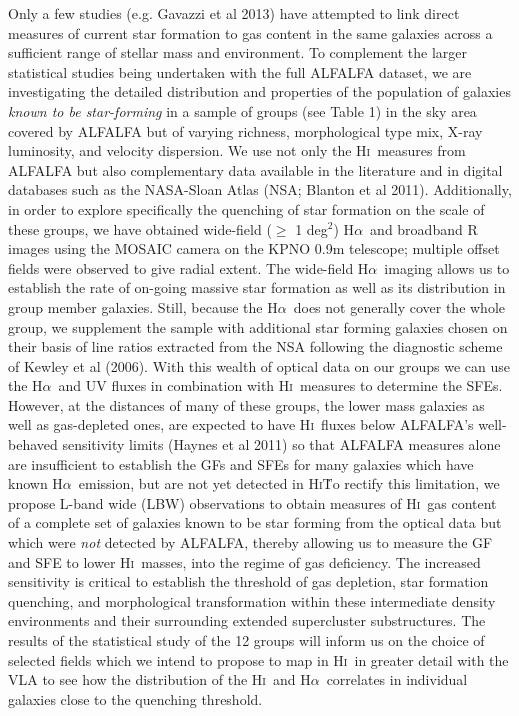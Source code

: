 \documentclass[11pt]{article}
\newcommand{\Halpha}{H$\alpha$}
\newcommand{\sqd}{deg$^{2}$}
\newcommand{\HI}{H\textsc{i}}
\begin{document}
Only a few studies
(e.g. Gavazzi {et al} 2013) have attempted to link direct measures of
current star formation to gas content in the same galaxies across a
sufficient range of stellar mass and environment.
To complement the larger statistical
studies being undertaken with the full ALFALFA dataset, we are
investigating the detailed distribution and properties of the
population of galaxies {\it known to be star-forming}
in a sample of groups (see Table 1) in the sky area covered by ALFALFA
but of varying
richness, morphological type mix, X-ray luminosity, and velocity
dispersion. We use not only the \HI\ measures from ALFALFA but also
complementary data available in the literature and in digital
databases such as the NASA-Sloan Atlas (NSA; Blanton {et al}
2011). Additionally, in order to explore specifically the quenching of
star formation on the scale of these groups, we have obtained
wide-field ($\ge$ 1 \sqd) \Halpha\ and broadband R images using the
MOSAIC camera on the
KPNO 0.9m telescope; multiple offset fields were observed to give
radial extent.  The wide-field
\Halpha\ imaging allows us to establish the rate of
on-going massive star formation as well as its distribution in group
member galaxies. Still, because the \Halpha\ does not generally cover
the whole group, we supplement the sample with additional star forming
galaxies chosen on their basis of line ratios extracted from the
NSA following the diagnostic scheme of Kewley {et al} (2006).
With this wealth of optical data on our groups we can use the
\Halpha\ and UV
fluxes in combination with \HI\ measures to determine the SFEs. However,
at the distances of many of these groups,
the lower mass galaxies as well as gas-depleted ones,
are expected to have \HI\ fluxes below ALFALFA's
well-behaved sensitivity limits (Haynes {et al} 2011) so that ALFALFA
measures alone are insufficient to establish the GFs and SFEs for many
galaxies which have known \Halpha\ emission, but are not yet detected
in \HI\. To rectify this
limitation, we propose L-band wide (LBW) observations to obtain
measures of \HI\ gas content of a complete set of galaxies
known to be star forming from the optical data but which were {\it not}
detected by ALFALFA, thereby allowing us to measure the GF and SFE to
lower \HI\ masses, into the regime of gas deficiency. The increased
sensitivity is critical to establish the threshold of gas depletion, star
formation quenching, and morphological transformation within these
intermediate density environments and their surrounding extended
supercluster substructures. The results of the statistical study of the 12 groups
will inform us on the choice of selected fields which we intend
to propose to map in \HI\ in greater detail with the VLA to see how the
distribution of the \HI\ and \Halpha\ correlates in individual galaxies
close to the quenching threshold.
\end{document}
